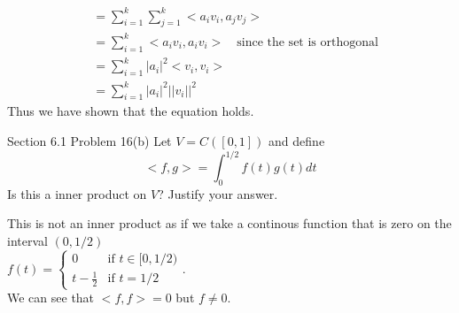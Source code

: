 \documentclass[answers,12pt,addpoints]{exam}
\begin{document}
\begin{questions}
\begin{solution}
\begin{align*}
            &= \sum_{i=1}^{k} \sum_{j=1}^k <a_iv_i, a_jv_j>\\
            &= \sum_{i=1}^{k} <a_iv_i, a_iv_i> \quad \text{since the set is orthogonal}\\
            &= \sum_{i=1}^{k} |a_i|^2<v_i,v_i>\\
            &= \sum_{i=1}^{k} |a_i|^2||v_i||^2
        \end{align*}
        Thus we have shown that the equation holds.
    \end{solution}
    \question Section 6.1 Problem 16(b)
    Let $V = C([0,1])$ and define 
    $$<f,g> = \int_{0}^{1/2} f(t)g(t)dt $$
    Is this a inner product on $V$? Justify your answer.
    \begin{solution}
        This is not an inner product as if we take a continous function that is zero on the interval $(0,1/2)$\\
        $f(t) = \begin{cases}
            0 & \text{if } t \in [0,1/2)\\
            t - \frac{1}{2} & \text{if } t = 1/2
        \end{cases} $. \\
        We can see that $<f,f> = 0$ but $f \neq 0$.
    \end{solution}

    

\end{questions}
\end{document}
